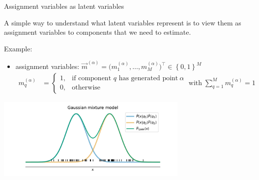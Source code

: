\begin{frame}{Assignment variables as latent variables}

A simple way to understand what latent variables represent is to view them as assignment variables to components that we need to estimate.

Example:\\

\begin{itemize} 
\item assignment variables: $\vec{m}^{(\alpha)} =  \big( m_1^{(\alpha)}, \dots, m_M^{(\alpha)} \big)^\top \in \left\{ 0, 1 \right\}^M$ \\
		\begin{align}
		m_q^{(\alpha)} &= 
		\begin{cases}
		1, & \text{if component } q \text{ has generated point}~\alpha\\
		0, & \text{otherwise}
		\end{cases}
		\;\text{with} \;
		 \sum_{q=1}^{M} m_q^{(\alpha)} = 1 
		\end{align}
\end{itemize}

\svspace{-7mm}


\begin{center}
	\includegraphics[width=0.7\textwidth]{img/latentexample_gmm}
\end{center}


\end{frame}

